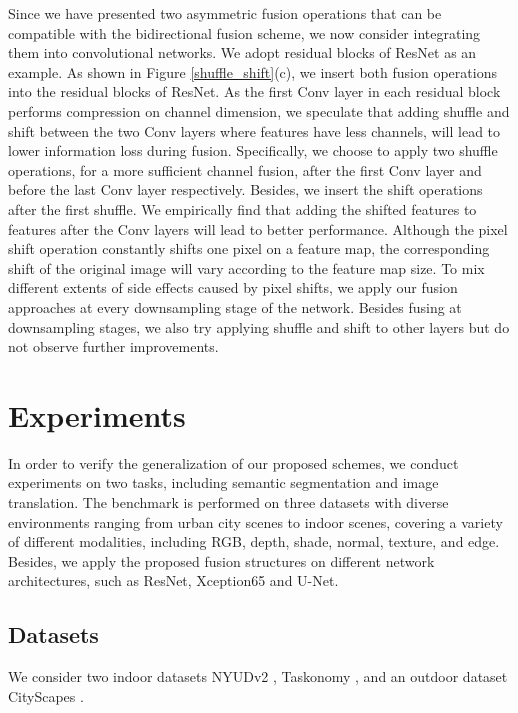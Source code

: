\documentclass[sigconf]{acmart}
\begin{document}
Since we have presented two asymmetric fusion operations that can be compatible with the bidirectional fusion scheme, we now consider integrating them into convolutional networks. We adopt residual blocks of ResNet \cite{DBLP:conf/cvpr/HeZRS16} as an example. As shown in Figure \ref{shuffle_shift}(c), we insert both fusion operations into the residual blocks of ResNet. As the first Conv layer in each residual block performs compression on channel dimension, we speculate that adding shuffle and shift between the two Conv layers where features have less channels, will lead to lower information loss during fusion. Specifically, we choose to apply two shuffle operations, for a more sufficient channel fusion, after the first Conv layer and before the last Conv layer respectively. Besides, we insert the shift operations after the first shuffle. We empirically find that adding the shifted features to features after the Conv layers will lead to better performance. Although the pixel shift operation constantly shifts one pixel on a feature map, the corresponding shift of the original image will vary according to the feature map size. To mix different extents of side effects caused by pixel shifts, we apply our fusion approaches at every downsampling stage of the network. Besides fusing at downsampling stages, we also try applying shuffle and shift to other layers but do not observe further improvements. 





\section{Experiments}
\label{experiments}

In order to verify the generalization of our proposed schemes, we conduct experiments on two tasks, including semantic segmentation and image translation. The benchmark is performed on three datasets with diverse environments ranging from urban city scenes to indoor scenes, covering a variety of different modalities, including RGB, depth, shade, normal, texture, and edge. Besides, we apply the proposed fusion structures on different network architectures, such as ResNet, Xception65 and U-Net.

\subsection{Datasets}
We consider  two indoor datasets NYUDv2 \cite{DBLP:conf/eccv/SilbermanHKF12}, Taskonomy \cite{DBLP:conf/cvpr/ZamirSSGMS18}, and an outdoor dataset CityScapes \cite{DBLP:conf/cvpr/CordtsORREBFRS16}.
\end{document}
